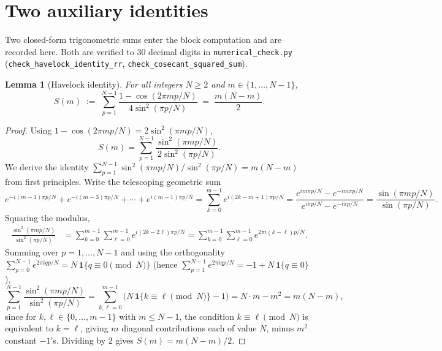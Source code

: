 \documentclass[11pt]{article}
\newtheorem{lemma}{Lemma}
\theoremstyle{remark}
\begin{document}
\section{Two auxiliary identities}\label{sec:aux}

Two closed-form trigonometric sums enter the block computation and are
recorded here. Both are verified to 30 decimal digits in
\texttt{numerical\_check.py} (\texttt{check\_havelock\_identity\_rr},
\texttt{check\_cosecant\_squared\_sum}).

\begin{lemma}[Havelock identity]\label{lem:havelock}
For all integers $N \ge 2$ and $m \in \{1, \ldots, N-1\}$,
\begin{equation}\label{eq:havelock}
  S(m) \;:=\; \sum_{p=1}^{N-1} \frac{1 - \cos(2\pi m p / N)}{4 \sin^2(\pi p / N)}
  \;=\; \frac{m(N-m)}{2}.
\end{equation}
\end{lemma}

\begin{proof}
Using $1 - \cos(2\pi m p / N) = 2 \sin^2(\pi m p / N)$,
\begin{equation}\label{eq:Sm-sin-form}
  S(m) = \sum_{p=1}^{N-1} \frac{\sin^2(\pi m p / N)}{2 \sin^2(\pi p / N)}.
\end{equation}
We derive the identity
$\sum_{p=1}^{N-1} \sin^2(\pi m p / N) / \sin^2(\pi p / N) = m(N - m)$
from first principles. Write the telescoping geometric sum
\[
  e^{-i(m-1)\pi p/N} + e^{-i(m-3)\pi p/N} + \cdots + e^{i(m-1)\pi p/N}
   = \sum_{k=0}^{m-1} e^{i(2k - m + 1)\pi p / N}
   = \frac{e^{i m \pi p / N} - e^{-i m \pi p / N}}{e^{i \pi p / N} - e^{-i \pi p / N}}
   = \frac{\sin(\pi m p / N)}{\sin(\pi p / N)}.
\]
Squaring the modulus,
\begin{align*}
  \frac{\sin^2(\pi m p / N)}{\sin^2(\pi p / N)}
  &= \sum_{k=0}^{m-1}\sum_{\ell=0}^{m-1} e^{i(2k - 2\ell)\pi p / N}
   = \sum_{k=0}^{m-1}\sum_{\ell=0}^{m-1} e^{2\pi i (k-\ell) p / N}.
\end{align*}
Summing over $p = 1, \ldots, N-1$ and using the orthogonality
$\sum_{p=0}^{N-1} e^{2\pi i q p / N} = N\,\mathbf{1}\{q \equiv 0\!\!\pmod N\}$
(hence $\sum_{p=1}^{N-1} e^{2\pi i q p / N} = -1 + N\,\mathbf{1}\{q \equiv 0\}$),
\[
  \sum_{p=1}^{N-1}\frac{\sin^2(\pi m p / N)}{\sin^2(\pi p / N)}
  = \sum_{k, \ell = 0}^{m-1}\bigl(N\,\mathbf{1}\{k \equiv \ell\!\!\pmod N\} - 1\bigr)
  = N \cdot m - m^2 = m(N - m),
\]
since for $k, \ell \in \{0, \ldots, m-1\}$ with $m \le N - 1$, the
condition $k \equiv \ell \pmod N$ is equivalent to $k = \ell$, giving
$m$ diagonal contributions each of value $N$, minus $m^2$ constant
$-1$'s. Dividing by $2$ gives $S(m) = m(N-m)/2$.
\end{proof}
\end{document}
